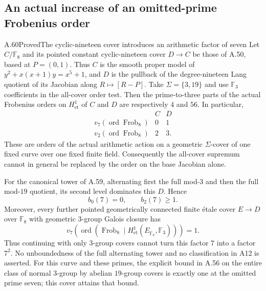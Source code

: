\subsection{An actual increase of an omitted-prime Frobenius order}

\begin{claim}{A.60}{Proved}{The cyclic-nineteen cover introduces an arithmetic factor of seven}
Let $C/\mathbb F _8$ and its pointed constant cyclic-nineteen
cover $D\to C$ be those of A.50, based at $P=(0,1)$.
Thus $C$ is the smooth proper model of
$y^2+x(x+1)y=x^5+1$, and $D$ is the pullback of the
degree-nineteen Lang quotient of its Jacobian along
$R\mapsto[R-P]$.
Take $\Sigma=\{3,19\}$ and use $\mathbb F _3$ coefficients
in the all-cover order test.
Then the prime-to-three parts of the actual Frobenius
orders on $H^1_{\mathrm{et}}$ of $C$ and $D$ are respectively
$4$ and $56$.  In particular,
\[
\begin{array}{c|cc}
 & C & D\\\hline
 v_7(\operatorname{ord}\operatorname{Frob}_8)&0&1\\
 v_2(\operatorname{ord}\operatorname{Frob}_8)&2&3.
\end{array}                                                   \tag{A.60.1}
\]
These are orders of the actual arithmetic action on a
geometric $\Sigma$-cover of one fixed curve over one fixed
finite field.
Consequently the all-cover supremum cannot in general be
replaced by the order on the base Jacobian alone.

For the canonical tower of A.59, alternating first the
full mod-$3$ and then the full mod-$19$ quotient, its second
level dominates this $D$.  Hence
\[
                         b_0(7)=0,\qquad b_2(7)\ge1.          \tag{A.60.2}
\]
Moreover, every further pointed geometrically connected
finite \'etale cover $E\to D$ over $\mathbb F _8$ with
geometric $3$-group Galois closure has
\[
 v_7\!\left(\operatorname{ord}
   (\operatorname{Frob}_8\mid H^1_{\mathrm{et}}
                     (E_{\overline{\mathbb F}_8},\mathbb F _3))\right)=1.
                                                                  \tag{A.60.3}
\]
Thus continuing with only $3$-group covers cannot turn
this factor $7$ into a factor $7^2$.
No unboundedness of the full alternating tower and no
classification in A12 is asserted.
For this curve and these primes, the explicit bound in
A.56 on the entire class of normal $3$-group by abelian
$19$-group covers is exactly one at the omitted prime
seven; this cover attains that bound.
\end{claim}

